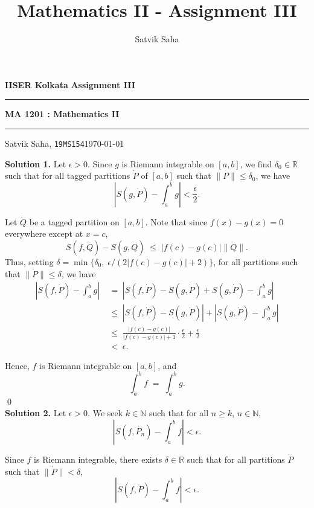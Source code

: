 \documentclass[10pt]{article}
\title{Mathematics II - Assignment III}
\author{Satvik Saha}
\date{}
\begin{document}
        \par\textbf{IISER Kolkata} \hfill \textbf{Assignment III}
        \vspace{3pt}
        \hrule
        \vspace{3pt}
        \begin{center}
                \LARGE{\textbf{MA 1201 : Mathematics II}}
        \end{center}
        \vspace{3pt}
        \hrule
        \vspace{3pt}
        Satvik Saha, \texttt{19MS154}\hfill\today
        \vspace{20pt}

        \textbf{Solution 1.}
        Let $\epsilon > 0$. Since $g$ is Riemann integrable on $[a, b]$, we find $\delta_0 \in \mathbb{R}$ such that for all tagged partitions $\dot{P}$ of 
        $[a, b]$ such that $ \| P  \| \le \delta_0$, we have
        \[| S(g, \dot{P}) - \int_a^b g | < \frac{\epsilon}2.\]
        
        Let $\dot{Q}$ be a tagged partition on $[a, b]$. Note that since $f(x) - g(x) = 0$ everywhere except at $x = c$,
        \[S(f, \dot{Q}) - S(g, \dot{Q}) \;\le\; |f(c) - g(c)|\|\dot{Q}\|.\]
        Thus, setting $\delta = \min \{ \delta_0, \;\epsilon / (2|f(c) - g(c)| + 2)\} $, for all partitions such that $\|\dot{P}\| \le \delta$, we have
        \begin{align*}
        |S(f, \dot{P}) - \int_a^b g| 
        \;&=\;   |S(f, \dot{P}) - S(g, \dot{P}) + S(g, \dot{P}) - \int_a^b g| \\
        \;&\le\; |S(f, \dot{P}) - S(g, \dot{P})| + |S(g, \dot{P}) - \int_a^b g| \\
        \;&\le\; \frac{|f(c) - g(c)|}{|f(c) - g(c)| + 1}\cdot\frac{\epsilon}2 + \frac{\epsilon}2 \\
        \;&<\; \epsilon.
        \end{align*}

        Hence, $f$ is Riemann integrable on $[a, b]$, and
        \[\int_a^b f \;=\; \int_a^b g.\] \qed\\

        \textbf{Solution 2.}
        Let $\epsilon > 0$. We seek $k \in \mathbb{N}$ such that for all $n \ge k$, $n \in \mathbb{N}$,
        \[ |S(f, \dot{P_n}) - \int_a^b f| < \epsilon.\]

        Since $f$ is Riemann integrable, there exists $\delta \in \mathbb{R}$ such that for all partitions $\dot{P}$ such that $\|\dot{P}\| < \delta$,
        \[|S(f, \dot{P}) - \int_a^b f| < \epsilon.\]
\end{document}
